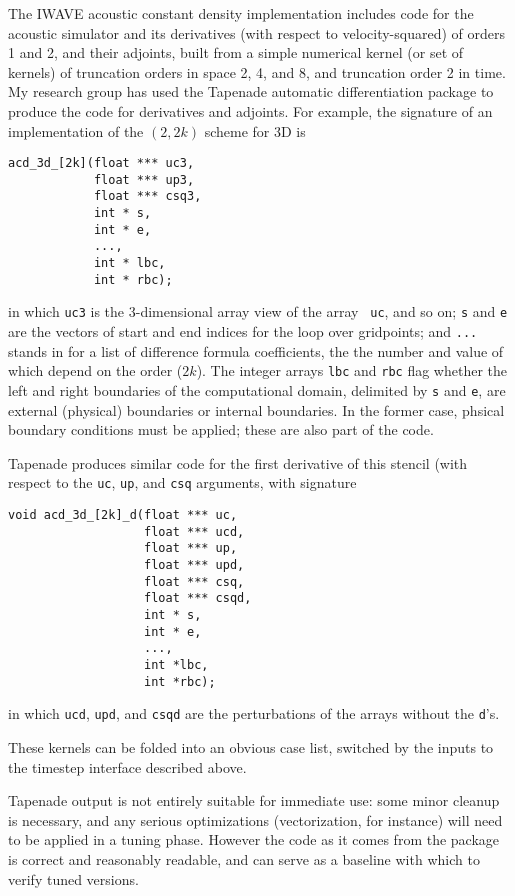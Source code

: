 The IWAVE acoustic constant density implementation includes code for
the acoustic simulator and its derivatives (with respect to
velocity-squared) of orders 1 and 2, and
their adjoints, built from a simple numerical kernel (or set
of kernels) of truncation orders in space 2, 4, and 8, and truncation
order 2 in time. My research group has used the Tapenade
\cite[]{TapenadeRef13} automatic differentiation package to produce the
code for derivatives and adjoints. For example, the signature of an
implementation of the $(2, 2k)$ scheme for 3D is
\begin{verbatim}
acd_3d_[2k](float *** uc3, 
            float *** up3, 
            float *** csq3, 
            int * s, 
            int * e,
            ...,
            int * lbc,
            int * rbc);
\end{verbatim}
in which {\tt uc3} is the 3-dimensional array view of the array {\tt
  uc}, and so on; {\tt s} and {\tt e} are the vectors of start and end
indices for the loop over gridpoints; and {\tt ...} stands in for a
list of difference formula coefficients, the the number and value of
which depend on the order ($2k$). The integer arrays {\tt lbc} and
{\tt rbc} flag whether the left and right boundaries of the
computational domain, delimited by {\tt s} and {\tt e}, are external
(physical) boundaries or internal boundaries. In the former case,
phsical boundary conditions must be applied; these are also part of
the code.

Tapenade produces similar code for the first derivative of
this stencil (with respect to the {\tt uc}, {\tt up}, and {\tt csq}
arguments, with signature
\begin{verbatim}
void acd_3d_[2k]_d(float *** uc, 
                   float *** ucd, 
                   float *** up, 
                   float *** upd, 
                   float *** csq,
                   float *** csqd, 
                   int * s, 
                   int * e, 
                   ...,
                   int *lbc,
                   int *rbc);
\end{verbatim}
in which {\tt ucd}, {\tt upd}, and {\tt csqd} are the perturbations of
the arrays without the {\tt d}'s. 

These kernels can be folded into an obvious case list, switched by the
inputs to the timestep interface described above.

Tapenade output is not entirely suitable for immediate use: some minor
cleanup is necessary, and any serious optimizations (vectorization,
for instance) will need to be applied in a tuning phase. However the
code as it comes from the package is correct and reasonably readable,
and can serve as a baseline with which to verify tuned versions.

